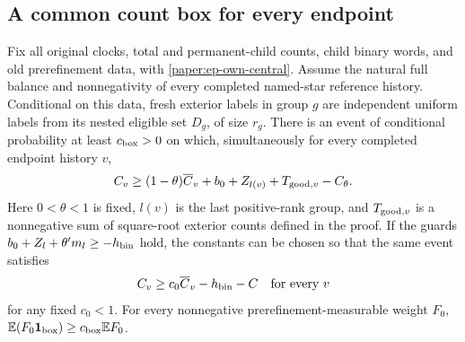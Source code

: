 \subsection{A common count box for every endpoint}
\label{paper:ep-endpoint-boxes}
\begin{proposition}\label{paper:ep-count-box}
Fix all original clocks, total and permanent-child counts, child binary
words, and old prerefinement data, with \eqref{paper:ep-own-central}.
Assume the natural full balance and nonnegativity of every completed
named-star reference history.  Conditional on this data, fresh exterior
labels in group $g$ are independent uniform labels from its nested
eligible set $D_g$, of size $r_g$.
There is an event of conditional probability at least $c_{\rm box}>0$
on which, simultaneously for every completed endpoint history $v$,
\begin{equation}\label{paper:ep-box-strong}
 C_v\geq(1-\theta)\overline C_v+b_0+Z_{l(v)}
                  +T_{{\rm good},v}-C_\theta.
\end{equation}
Here $0<\theta<1$ is fixed, $l(v)$ is the last positive-rank group,
and $T_{{\rm good},v}$ is a nonnegative sum of square-root exterior
counts defined in the proof.  If the guards
$b_0+Z_l+\theta' m_l\geq-h_{\rm bin}$ hold, the constants can be
chosen so that the same event satisfies
\begin{equation}\label{paper:ep-box-row}
 C_v\geq c_0\overline C_v-h_{\rm bin}-C
 \quad\hbox{for every }v
\end{equation}
for any fixed $c_0<1$.
For every nonnegative prerefinement-measurable weight $F_0$,
$\mathbb E(F_0\mathbf1_{\rm box})\geq c_{\rm box}\mathbb EF_0$.
\end{proposition}
